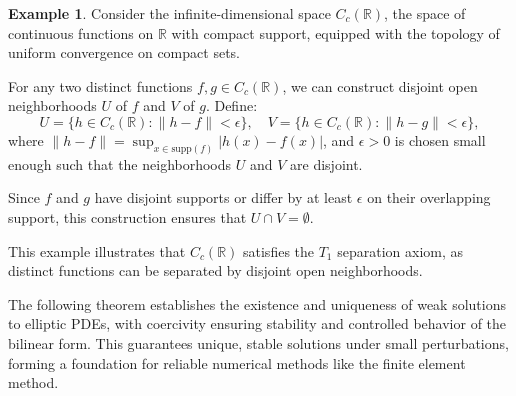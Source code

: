\documentclass[12pt, reqno]{amsart}
\theoremstyle{definition}
\newtheorem{example}[theorem]{Example}
\numberwithin{equation}{section}
\begin{document}
\begin{example}
Consider the infinite-dimensional space \( C_c(\mathbb{R}) \), the space of continuous functions on \( \mathbb{R} \) with compact support, equipped with the topology of uniform convergence on compact sets. 

For any two distinct functions \( f, g \in C_c(\mathbb{R}) \), we can construct disjoint open neighborhoods \( U \) of \( f \) and \( V \) of \( g \). Define:
\[
U = \{h \in C_c(\mathbb{R}) : \|h - f\| < \epsilon\}, \quad V = \{h \in C_c(\mathbb{R}) : \|h - g\| < \epsilon\},
\]
where \( \|h - f\| = \sup_{x \in \mathrm{supp}(f)} |h(x) - f(x)| \), and \( \epsilon > 0 \) is chosen small enough such that the neighborhoods \( U \) and \( V \) are disjoint. 

Since \( f \) and \( g \) have disjoint supports or differ by at least \( \epsilon \) on their overlapping support, this construction ensures that \( U \cap V = \emptyset \). 

This example illustrates that \( C_c(\mathbb{R}) \) satisfies the \( T_1 \) separation axiom, as distinct functions can be separated by disjoint open neighborhoods.
\end{example}


The following theorem establishes the existence and uniqueness of weak solutions to elliptic PDEs, with coercivity ensuring stability and controlled behavior of the bilinear form. This guarantees unique, stable solutions under small perturbations, forming a foundation for reliable numerical methods like the finite element method.
\end{document}
